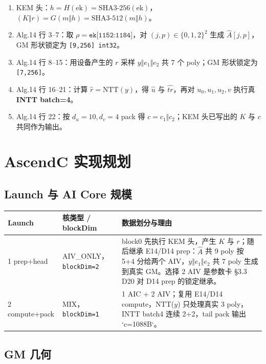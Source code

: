 \documentclass[UTF8,a4paper,11pt]{ctexart}
\begin{document}
\begin{enumerate}
  \item KEM 头：$h=H(\mathrm{ek})=\mathrm{SHA3\textrm{-}256}(\mathrm{ek})$，$(K\Vert r)=G(m\Vert h)=\mathrm{SHA3\textrm{-}512}(m\Vert h)$。
  \item Alg.14 行 3--7：取 \(\rho=\texttt{ek[1152:1184]}\)，对 \((j,p)\in\{0,1,2\}^2\) 生成 \(\hat A[j,p]\)，GM 形状锁定为 \texttt{[9,256] int32}。
  \item Alg.14 行 8--15：用设备产生的 \(r\) 采样 \(y\Vert e_1\Vert e_2\) 共 7 个 poly；GM 形状锁定为 \texttt{[7,256]}。
  \item Alg.14 行 16--21：计算 \(\hat r=\mathrm{NTT}(y)\)，得 \(\hat u\) 与 \(\widehat{tr}\)，再对 \(u_0,u_1,u_2,v\) 执行真 \textbf{INTT batch=4}。
  \item Alg.14 行 22：按 \(d_u=10,d_v=4\) pack 得 \(c=c_1\Vert c_2\)；KEM 头已写出的 \(K\) 与 \(c\) 共同作为输出。
\end{enumerate}

\section{AscendC 实现规划}

\subsection{Launch 与 AI Core 规模}

\begin{longtable}{@{}L{2.5cm}L{3.1cm}L{7.5cm}@{}}
\toprule
Launch & 核类型 / blockDim & 数据划分与理由 \\
 prep+head & AIV\_ONLY，\texttt{blockDim=2} & block0 先执行 KEM 头，产生 \(K\) 与 \(r\)；随后继承 E14/D14 prep：$\hat A$ 共 9 poly 按 5+4 分给两个 AIV，\(y\Vert e_1\Vert e_2\) 共 7 poly 生成到真实 GM。选择 2 AIV 是参数卡 §3.3 D20 对 D14 prep 的锁定继承。 \\
2 compute+pack & MIX，\texttt{blockDim=1} & 1 AIC + 2 AIV；复用 E14/D14 compute，NTT(\(y\)) 只处理真实 3 poly，INTT batch4 连续 2+2，tail pack 输出 `c=1088B`。 \\
\bottomrule
\end{longtable}

\subsection{GM 几何}
\end{document}
